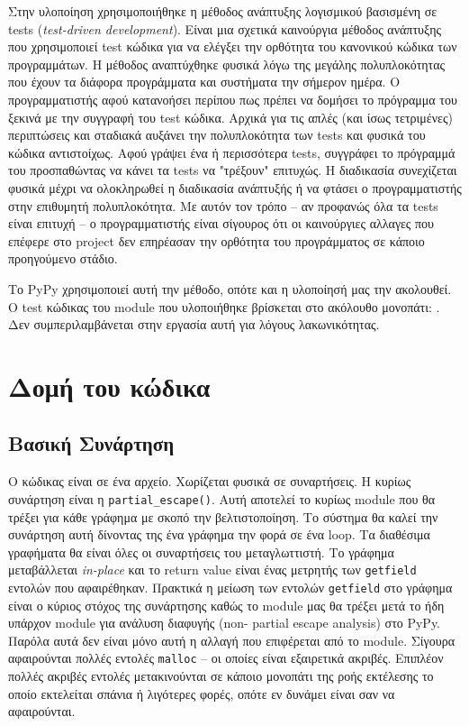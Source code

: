 Στην υλοποίηση χρησιμοποιήθηκε η μέθοδος ανάπτυξης λογισμικού βασισμένη σε
tests (\textit{test-driven development}\cite{tdd}). Είναι μια σχετικά
καινούργια μέθοδος ανάπτυξης που χρησιμοποιεί test κώδικα για να ελέγξει την
ορθότητα του κανονικού κώδικα των προγραμμάτων. Η μέθοδος αναπτύχθηκε φυσικά
λόγω της μεγάλης πολυπλοκότητας που έχουν τα διάφορα προγράμματα και συστήματα
την σήμερον ημέρα. Ο προγραμματιστής αφού κατανοήσει περίπου πως πρέπει να
δομήσει το πρόγραμμα του ξεκινά με την συγγραφή του test κώδικα. Αρχικά για
τις απλές (και ίσως τετριμένες) περιπτώσεις και σταδιακά αυξάνει την
πολυπλοκότητα των tests και φυσικά του κώδικα αντιστοίχως. Αφού γράψει ένα ή
περισσότερα tests, συγγράφει το πρόγραμμά του προσπαθώντας να κάνει τα tests
να "τρέξουν" επιτυχώς. Η διαδικασία συνεχίζεται φυσικά μέχρι να ολοκληρωθεί η
διαδικασία ανάπτυξής ή να φτάσει ο προγραμματιστής στην επιθυμητή
πολυπλοκότητα. Με αυτόν τον τρόπο – αν προφανώς όλα τα tests είναι επιτυχή – ο
προγραμματιστής είναι σίγουρος ότι οι καινούργιες αλλαγες που επέφερε στο
project δεν επηρέασαν την ορθότητα του προγράμματος σε κάποιο προηγούμενο
στάδιο.

Το PyPy χρησιμοποιεί αυτή την μέθοδο, οπότε και η υλοποίησή μας την ακολουθεί.
Ο test κώδικας του module που υλοποιήθηκε βρίσκεται στο ακόλουθο μονοπάτι:
. Δεν
συμπεριλαμβάνεται στην εργασία αυτή για λόγους λακωνικότητας.


\section{Δομή του κώδικα}

\subsection{Βασική Συνάρτηση}

Ο κώδικας είναι σε ένα αρχείο. Χωρίζεται φυσικά σε συναρτήσεις. Η κυρίως
συνάρτηση είναι η \texttt{partial\_escape()}. Αυτή αποτελεί το κυρίως module που
θα τρέξει για κάθε γράφημα με σκοπό την βελτιστοποίηση. Το σύστημα θα καλεί την
συνάρτηση αυτή δίνοντας της ένα γράφημα την φορά σε ένα loop. Τα διαθέσιμα
γραφήματα θα είναι όλες οι συναρτήσεις του μεταγλωττιστή. Το γράφημα
μεταβάλλεται \textit{in-place} και το return value είναι ένας μετρητής των
\texttt{getfield} εντολών που αφαιρέθηκαν. Πρακτικά η μείωση των εντολών
\texttt{getfield} στο γράφημα είναι ο κύριος στόχος της συνάρτησης καθώς το
module μας θα τρέξει μετά το ήδη υπάρχον module για ανάλυση διαφυγής (non-
partial escape analysis) στο PyPy. Παρόλα αυτά δεν είναι μόνο αυτή η αλλαγή που
επιφέρεται από το module. Σίγουρα αφαιρούνται πολλές εντολές \texttt{malloc} –
οι οποίες είναι εξαιρετικά ακριβές. Επιπλέον πολλές ακριβές εντολές
μετακινούνται σε κάποιο μονοπάτι της ροής εκτέλεσης το οποίο εκτελείται σπάνια ή
λιγότερες φορές, οπότε εν δυνάμει είναι σαν να αφαιρούνται.


